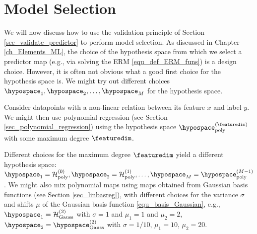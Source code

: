 \documentclass[12pt]{report}
\begin{document}
\section{Model Selection}
\label{sec_modsel}

We will now discuss how to use the validation principle of 
Section \ref{sec_validate_predictor} to perform model selection. 
As discussed in Chapter \ref{ch_Elements_ML}, the choice of 
the hypothesis space from which we select a predictor map 
(e.g., via solving the ERM \eqref{equ_def_ERM_funs}) is a design choice. 
However, it is often not obvious what a good first choice 
for the hypothesis space is. We might try out different 
choices $\hypospace_{1},\hypospace_{2},\ldots,\hypospace_{M}$ 
for the hypothesis space. 

Consider datapoints with a non-linear relation between its 
feature $x$ and label $y$. We might then use polynomial 
regression (see Section \ref{sec_polynomial_regression}) 
using the hypothesis space $\hypospace_{\rm poly}^{(\featuredim)}$ 
with some maximum degree $\featuredim$. 

Different choices for the maximum degree $\featuredim$ yield 
a different hypothesis space: $\hypospace_{1} = \mathcal{H}_{\rm poly}^{(0)},\hypospace_{2} = \mathcal{H}_{\rm poly}^{(1)},\ldots,\hypospace_{M} = \hypospace_{\rm poly}^{(M-1)}$. 
We might also mix polynomial maps using maps obtained from  
Gaussian basis functions (see Section \ref{sec_linbasreg}), 
with different choices for the variance $\sigma$ and shifts $\mu$ 
of the Gaussian basis function \eqref{equ_basis_Gaussian}, 
e.g., $\hypospace_{1} = \mathcal{H}^{(2)}_{\rm Gauss}$ with $\sigma=1$ and $\mu_{1}=1$ and $\mu_{2}=2$, 
$\hypospace_{2} = \hypospace^{(2)}_{\rm Gauss}$ with $\sigma = 1/10$, $\mu_{1}=10$, $\mu_{2}= 20$.
\end{document}
